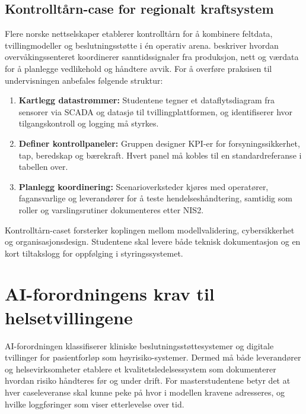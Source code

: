 \subsection{Kontrolltårn-case for regionalt kraftsystem}
Flere norske nettselskaper etablerer kontrolltårn for å kombinere feltdata, tvillingmodeller og beslutningsstøtte i én operativ arena. \citet{statnett2024kontrolltarn} beskriver hvordan overvåkingssenteret koordinerer sanntidssignaler fra produksjon, nett og værdata for å planlegge vedlikehold og håndtere avvik. For å overføre praksisen til undervisningen anbefales følgende struktur:
\begin{enumerate}
    \item \textbf{Kartlegg datastrømmer:} Studentene tegner et dataflytsdiagram fra sensorer via SCADA og datasjø til tvillingplattformen, og identifiserer hvor tilgangskontroll og logging må styrkes.
    \item \textbf{Definer kontrollpaneler:} Gruppen designer KPI-er for forsyningssikkerhet, tap, beredskap og bærekraft. Hvert panel må kobles til en standardreferanse i tabellen over.
    \item \textbf{Planlegg koordinering:} Scenarioverksteder kjøres med operatører, fagansvarlige og leverandører for å teste hendelseshåndtering, samtidig som roller og varslingsrutiner dokumenteres etter NIS2.
\end{enumerate}
Kontrolltårn-caset forsterker koplingen mellom modellvalidering, cybersikkerhet og organisasjonsdesign. Studentene skal levere både teknisk dokumentasjon og en kort tiltakslogg for oppfølging i styringssystemet.

\section{AI-forordningens krav til helsetvillingene}
AI-forordningen klassifiserer kliniske beslutningsstøttesystemer og digitale tvillinger for pasientforløp som høyrisiko-systemer.\citep{eu2024aiact} Dermed må både leverandører og helsevirksomheter etablere et kvalitetsledelsessystem som dokumenterer hvordan risiko håndteres før og under drift. For masterstudentene betyr det at hver caseleveranse skal kunne peke på hvor i modellen kravene adresseres, og hvilke loggføringer som viser etterlevelse over tid.

